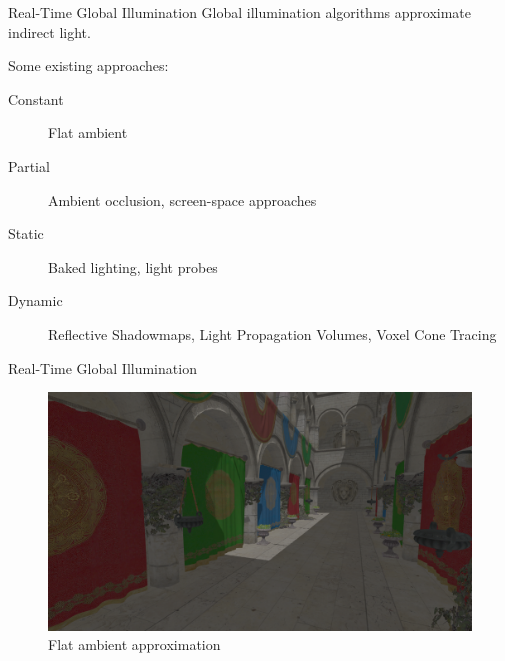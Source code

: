 \documentclass[10pt]{beamer}
\begin{document}
\begin{frame}{Real-Time Global Illumination}
  Global illumination algorithms approximate indirect light.

  Some existing approaches:

  \begin{description}
    \item[Constant] Flat ambient %
    \item[Partial] Ambient occlusion, screen-space approaches %
    \item[Static] Baked lighting, light probes
    \item[Dynamic] Reflective Shadowmaps, Light Propagation Volumes, Voxel Cone Tracing
  \end{description}
\end{frame}

\begin{frame}{Real-Time Global Illumination}
  \begin{figure}
    \includegraphics[width=\textwidth]{gi_off.png}
    \caption*{Flat ambient approximation}
  \end{figure}
\end{frame}
\end{document}
